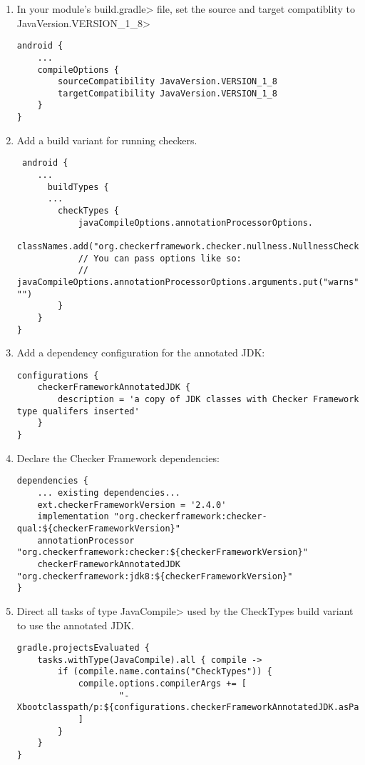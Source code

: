 \begin{enumerate}

\item In your module's \<build.gradle> file, set the source and target
  compatiblity to \<JavaVersion.VERSION\_1\_8>

\begin{Verbatim}
android {
    ...
    compileOptions {
        sourceCompatibility JavaVersion.VERSION_1_8
        targetCompatibility JavaVersion.VERSION_1_8
    }
}
\end{Verbatim}

\item Add a build variant for running checkers.

 \begin{Verbatim}
 android {
    ...
      buildTypes {
      ...
        checkTypes {
            javaCompileOptions.annotationProcessorOptions.
                    classNames.add("org.checkerframework.checker.nullness.NullnessChecker")
            // You can pass options like so:
            // javaCompileOptions.annotationProcessorOptions.arguments.put("warns", "")
        }
    }
}
\end{Verbatim}

\item Add a dependency configuration for the annotated JDK:

\begin{mysmall}
\begin{Verbatim}
configurations {
    checkerFrameworkAnnotatedJDK {
        description = 'a copy of JDK classes with Checker Framework type qualifers inserted'
    }
}

\end{Verbatim}
\end{mysmall}

\item Declare the Checker Framework dependencies:

\begin{mysmall}
\begin{Verbatim}
dependencies {
    ... existing dependencies...
    ext.checkerFrameworkVersion = '2.4.0'
    implementation "org.checkerframework:checker-qual:${checkerFrameworkVersion}"
    annotationProcessor "org.checkerframework:checker:${checkerFrameworkVersion}"
    checkerFrameworkAnnotatedJDK "org.checkerframework:jdk8:${checkerFrameworkVersion}"
}
\end{Verbatim}
\end{mysmall}

\item Direct all tasks of type \<JavaCompile> used by the CheckTypes build variant to use the annotated JDK.
\begin{mysmall}
\begin{Verbatim}
gradle.projectsEvaluated {
    tasks.withType(JavaCompile).all { compile ->
        if (compile.name.contains("CheckTypes")) {
            compile.options.compilerArgs += [
                    "-Xbootclasspath/p:${configurations.checkerFrameworkAnnotatedJDK.asPath}"
            ]
        }
    }
}
\end{Verbatim}
\end{mysmall}


\end{enumerate}
